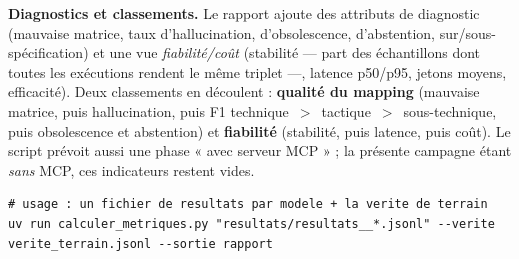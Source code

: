 \textbf{Diagnostics et classements.} Le rapport ajoute des attributs de diagnostic
(mauvaise matrice, taux d'hallucination, d'obsolescence, d'abstention,
sur/sous-spécification) et une vue \emph{fiabilité/coût} (stabilité — part des
échantillons dont toutes les exécutions rendent le même triplet —, latence p50/p95,
jetons moyens, efficacité). Deux classements en découlent : \textbf{qualité du
mapping} (mauvaise matrice, puis hallucination, puis F1 technique~$>$~tactique~$>$~sous-technique,
puis obsolescence et abstention) et \textbf{fiabilité} (stabilité, puis latence,
puis coût). Le script prévoit aussi une phase « avec serveur MCP » ; la présente
campagne étant \emph{sans} MCP, ces indicateurs restent vides.

\begin{lstlisting}[style=bash]
# usage : un fichier de resultats par modele + la verite de terrain
uv run calculer_metriques.py "resultats/resultats__*.jsonl" --verite verite_terrain.jsonl --sortie rapport
\end{lstlisting}



